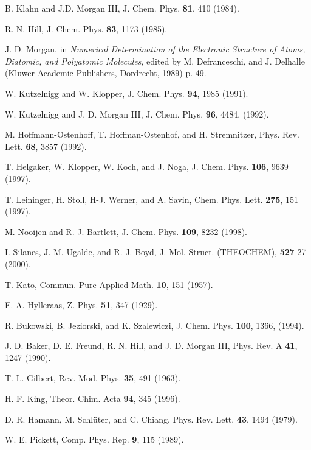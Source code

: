 \begin{thebibliography}{99}
%

 B. Klahn and J.D. Morgan III, 
J. Chem. Phys. {\bf 81}, 410 (1984).

 R. N. Hill, J. Chem. Phys. {\bf 83}, 1173 (1985).

 J. D. Morgan, in 
{\it Numerical Determination of the Electronic Structure of Atoms, 
Diatomic, and Polyatomic Molecules}, edited by M. Defranceschi, and 
J. Delhalle (Kluwer Academic Publishers, Dordrecht, 1989) p. 49.

 W. Kutzelnigg and W. Klopper,  J. Chem. Phys. {\bf 94}, 1985 (1991).

 W. Kutzelnigg and J. D. Morgan III, 
J. Chem. Phys. {\bf 96}, 4484, (1992).

 M. Hoffmann-Ostenhoff, T. Hoffman-Ostenhof, and H. Stremnitzer,
Phys. Rev. Lett. {\bf 68}, 3857 (1992).

 T. Helgaker, W. Klopper, W. Koch, and J. Noga,
J. Chem. Phys. {\bf 106}, 9639 (1997).

 T. Leininger, H. Stoll, H-J. Werner, and A. Savin, 
Chem. Phys. Lett. {\bf 275}, 151 (1997).

 M. Nooijen and R. J. Bartlett, 
J. Chem. Phys. {\bf 109}, 8232 (1998).

 I. Silanes, J. M. Ugalde, and R. J. Boyd, 
J. Mol. Struct. (THEOCHEM), {\bf 527} 27 (2000).

 T. Kato, Commun. Pure Applied Math. {\bf 10}, 151 (1957).

E. A. Hylleraas, Z. Phys. {\bf 51}, 347 (1929).

 R. Bukowski, B. Jeziorski, and K. Szalewiczi, 
J. Chem. Phys. {\bf 100}, 1366, (1994).

 J. D. Baker, D. E. Freund, R. N. Hill, and J. D. Morgan III, 
Phys. Rev. A {\bf 41}, 1247 (1990).

 T. L. Gilbert, Rev. Mod. Phys. {\bf 35}, 491 (1963).

 H. F. King, Theor. Chim. Acta {\bf 94}, 345 (1996).

 D. R. Hamann, M. Schl\"uter, and C. Chiang,
Phys. Rev. Lett. {\bf 43}, 1494 (1979).

 W. E. Pickett, Comp. Phys. Rep. {\bf 9}, 115 (1989).


\end{thebibliography}
